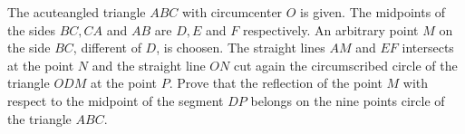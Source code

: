 The acuteangled triangle $ABC$ with circumcenter $O$ is given. The midpoints of the sides $BC, CA$ and $AB$ are $D, E$ and $F$ respectively. An arbitrary point $M$ on the side $BC$,  different of $D$,  is choosen. The straight lines $AM$ and $EF$ intersects at the point $N$ and the straight line $ON$ cut again the circumscribed circle of the triangle $ODM$ at the point $P$. Prove that the reflection of the point $M$ with respect to the midpoint of the segment $DP$ belongs on the nine points circle of the triangle $ABC$.